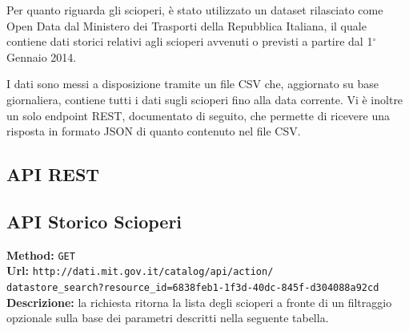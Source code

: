 Per quanto riguarda gli scioperi, è stato utilizzato un dataset rilasciato come Open Data
dal Ministero dei Trasporti della Repubblica Italiana, il quale contiene dati storici
relativi agli scioperi avvenuti o previsti a partire dal 1$^\circ$ Gennaio 2014.

I dati sono messi a disposizione tramite un file CSV che, aggiornato su base giornaliera,
contiene tutti i dati sugli scioperi fino alla data corrente. Vi è inoltre un solo 
endpoint REST, documentato di seguito, che permette di ricevere una risposta in formato
JSON di quanto contenuto nel file CSV.

\subsection{API REST}

\subsection{API Storico Scioperi}

\textbf{Method:} \texttt{GET} \\
\textbf{Url:} \texttt{http://dati.mit.gov.it/catalog/api/action/\\datastore\_search?resource\_id=6838feb1-1f3d-40dc-845f-d304088a92cd} \\

\noindent\textbf{Descrizione:} la richiesta ritorna la lista degli scioperi a fronte di
un filtraggio opzionale sulla base dei parametri descritti nella seguente tabella.

\begin{table}[H]
\centering
{}
\end{table}

